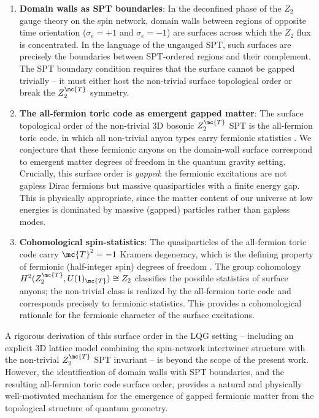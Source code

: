 \begin{enumerate}
	\item \textbf{Domain walls as SPT boundaries}: In the deconfined phase of the $ Z_2 $ gauge theory on the spin network, domain walls between regions of opposite time orientation ($ \sigma_e = +1 $ and $ \sigma_e = -1 $) are surfaces across which the $ Z_2 $ flux is concentrated. In the language of the ungauged SPT, such surfaces are precisely the boundaries between SPT-ordered regions and their complement. The SPT boundary condition requires that the surface cannot be gapped trivially -- it must either host the non-trivial surface topological order or break the $ Z_2^{\mc{T}} $ symmetry.

	\item \textbf{The all-fermion toric code as emergent gapped matter}: The surface topological order of the non-trivial 3D bosonic $ Z_2^{\mc{T}} $ SPT is the all-fermion toric code, in which all non-trivial anyon types carry fermionic statistics \cite{Vishwanath2013Physics}. We conjecture that these fermionic anyons on the domain-wall surface correspond to emergent matter degrees of freedom in the quantum gravity setting. Crucially, this surface order is \emph{gapped}: the fermionic excitations are not gapless Dirac fermions but massive quasiparticles with a finite energy gap. This is physically appropriate, since the matter content of our universe at low energies is dominated by massive (gapped) particles rather than gapless modes.

	\item \textbf{Cohomological spin-statistics}: The quasiparticles of the all-fermion toric code carry $ \mc{T}^2 = -1 $ Kramers degeneracy, which is the defining property of fermionic (half-integer spin) degrees of freedom \cite{Kapustin2014Symmetry}. The group cohomology $ H^2(Z_2^{\mc{T}}, U(1)_{\mc{T}}) \cong Z_2 $ classifies the possible statistics of surface anyons; the non-trivial class is realized by the all-fermion toric code and corresponds precisely to fermionic statistics. This provides a cohomological rationale for the fermionic character of the surface excitations.
\end{enumerate}

A rigorous derivation of this surface order in the LQG setting -- including an explicit 3D lattice model combining the spin-network intertwiner structure with the non-trivial $ Z_2^{\mc{T}} $ SPT invariant -- is beyond the scope of the present work. However, the identification of domain walls with SPT boundaries, and the resulting all-fermion toric code surface order, provides a natural and physically well-motivated mechanism for the emergence of gapped fermionic matter from the topological structure of quantum geometry.
